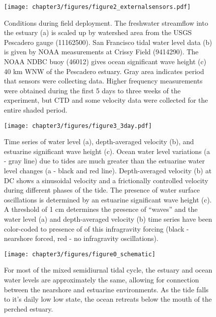 \begin{figure}
\texttt{[image: chapter3/figures/figure2\_externalsensors.pdf]}

\protect\caption{Conditions during field deployment. The freshwater streamflow into
the estuary (a) is scaled up by watershed area from the USGS Pescadero
gauge (11162500). San Francisco tidal water level data (b) is given
by NOAA measurements at Crissy Field (9414290). The NOAA NDBC buoy
(46012) gives ocean significant wave height (c) 40 km WNW of the Pescadero
estuary. Gray area indicates period that sensors were collecting data.
Higher frequency measurements were obtained during the first 5 days
to three weeks of the experiment, but CTD and some velocity data were
collected for the entire shaded period. \label{f2_QTHs}}


\end{figure}


\begin{figure}
\texttt{[image: chapter3/figures/figure3\_3day.pdf]}

\protect\caption{Time series of water level (a), depth-averaged velocity (b), and estuarine
significant wave height (c). Ocean water level variations (a - gray
line) due to tides are much greater than the estuarine water level
changes (a - black and red line). Depth-averaged velocity (b) at DC
shows a sinusoidal velocity and a frictionally controlled velocity
during different phases of the tide. The presence of water surface
oscillations is determined by an estuarine significant wave height
(c). A threshold of 1 cm determines the presence of ``waves'' and
the water level (a) and depth-averaged velocity (b) time series have
been color-coded to presence of of this infragravity forcing (black
- nearshore forced, red - no infragravity oscillations). \label{f3_HUHse}}
\end{figure}


\begin{figure}
\centering
\texttt{[image: chapter3/figures/figure0\_schematic]}

\protect\caption{For most of the mixed semidiurnal tidal cycle, the estuary and ocean
water levels are approximately the same, allowing for connection between
the nearshore and estuarine environments. As the tide falls to it's
daily low low state, the ocean retreats below the mouth of the perched
estuary.\label{f4_wl_schematic}}
\end{figure}

